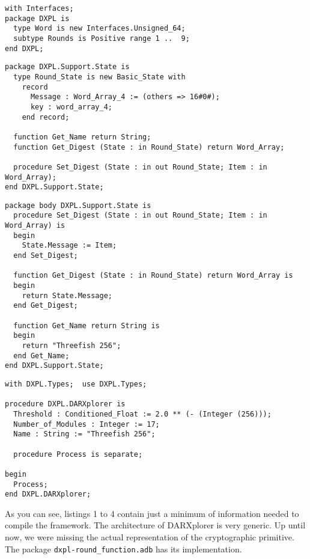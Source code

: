 \documentclass{acmtrans2m}
\begin{document}
\vfill

\begin{lstlisting}[caption=dxpl.ads]
with Interfaces;
package DXPL is 
  type Word is new Interfaces.Unsigned_64;
  subtype Rounds is Positive range 1 ..  9;
end DXPL; 
\end{lstlisting}

\clearpage

\begin{lstlisting}[caption=dxpl-support-state.ads]
package DXPL.Support.State is
  type Round_State is new Basic_State with
    record
      Message : Word_Array_4 := (others => 16#0#);
      key : word_array_4;
    end record;
    
  function Get_Name return String;
  function Get_Digest (State : in Round_State) return Word_Array;
  
  procedure Set_Digest (State : in out Round_State; Item : in Word_Array);
end DXPL.Support.State; 
\end{lstlisting}

\vfill

\begin{lstlisting}[caption=dxpl-support-state.adb]
package body DXPL.Support.State is
  procedure Set_Digest (State : in out Round_State; Item : in Word_Array) is
  begin
    State.Message := Item;
  end Set_Digest;
  
  function Get_Digest (State : in Round_State) return Word_Array is
  begin
    return State.Message;
  end Get_Digest;
  
  function Get_Name return String is
  begin
    return "Threefish 256";
  end Get_Name;
end DXPL.Support.State; 
\end{lstlisting}

\vfill

\begin{lstlisting}[caption=dxpl-darxplorer.adb]
with DXPL.Types;  use DXPL.Types;

procedure DXPL.DARXplorer is
  Threshold : Conditioned_Float := 2.0 ** (- (Integer (256)));
  Number_of_Modules : Integer := 17;
  Name : String := "Threefish 256";
  
  procedure Process is separate;

begin
  Process;
end DXPL.DARXplorer;
\end{lstlisting}

\clearpage

As you can see, listings 1 to 4 contain just a minimum of information
needed to compile the framework. The architecture of DARXplorer
is very generic. Up until now, we were missing the actual representation
of the cryptographic primitive. The package \texttt{dxpl-round\_function.adb}
has its implementation.
\end{document}
